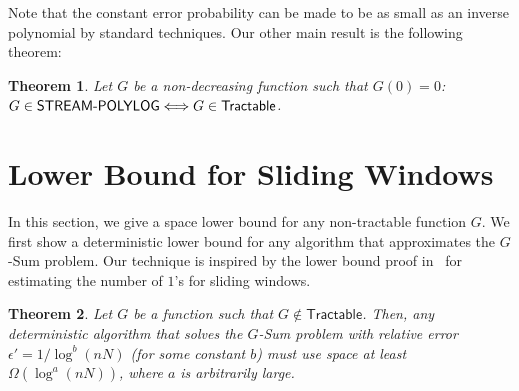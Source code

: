 \documentclass[11pt]{article}
\newtheorem{thm}{Theorem}
\begin{document}
\noindent Note that the constant error probability can be made to be as small as an inverse polynomial
by standard techniques.  Our other main result is the following theorem:
\begin{thm}\label{thm:zeroone}
Let $G$ be a non-decreasing function such that $G(0) = 0$:
$G\in \mbox{{\sf STREAM-POLYLOG}} \Longleftrightarrow G \in \mbox{\sf Tractable}$.
\end{thm}

\section{Lower Bound for Sliding Windows}
\label{sec:lb}

In this section, we give a space lower bound for any non-tractable function $G$.
We first show a deterministic lower bound for any algorithm that
approximates the $G$-Sum problem.  Our technique is inspired by the lower bound proof in~\cite{DGIM02} for
estimating the number of $1$'s for sliding windows.

\begin{thm}
Let $G$ be a function such that $G \not\in \mathsf{Tractable}$.  Then, any deterministic algorithm that
solves the $G$-Sum problem with relative error $\epsilon' = 1/\log^b(nN)$ (for some constant $b$) must
use space at least $\Omega(\log^a(nN))$, where $a$ is arbitrarily large.
\end{thm}
\end{document}
